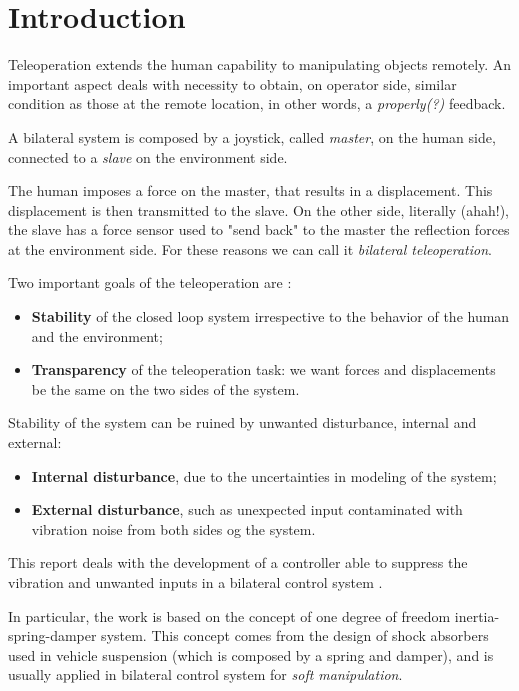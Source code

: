 \section*{Introduction}


Teleoperation extends the human capability to manipulating objects remotely. An important aspect deals with necessity to obtain, on operator side, similar condition as those at the remote location, in other words, a \emph{properly(?)} feedback. 

A bilateral system is composed by a joystick, called \emph{master}, on the human side, connected to a \emph{slave} on the environment side.

The human imposes a force on the master, that results in a displacement. This displacement is then transmitted to the slave. On the other side, literally (ahah!), the slave has a force sensor used to "send back" to the master the reflection forces at the environment side. For these reasons we can call it \emph{bilateral teleoperation}.

Two important goals of the teleoperation are \cite{hokayem2006bilateral}:
\begin{itemize}
	\item \textbf{Stability} of the closed loop system irrespective to the behavior of the human and the environment;
	\item \textbf{Transparency} of the teleoperation task: we want forces and displacements be the same on the two sides of the system. 
\end{itemize}

Stability of the system can be ruined by unwanted disturbance, internal and external:
\begin{itemize}
	\item \textbf{Internal disturbance}, due to the uncertainties in modeling of the system;
	\item \textbf{External disturbance}, such as unexpected input contaminated with vibration noise from both sides og the system.
\end{itemize}

This report deals with the development of a controller able to suppress the vibration and unwanted inputs in a bilateral control system \cite{trakarnchaiyo2017vibration}.

In particular, the work is based on the concept of one degree of freedom inertia-spring-damper system. This concept comes from the design of shock absorbers used in vehicle suspension (which is composed by a spring and damper), and is usually applied in bilateral control system for \emph{soft manipulation}.

